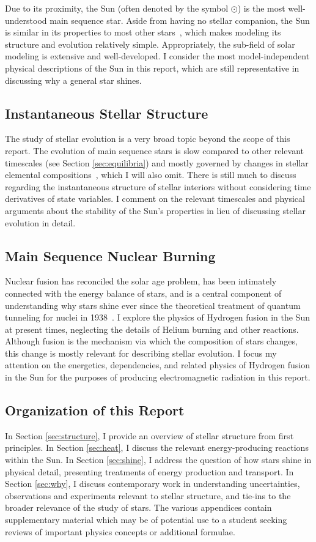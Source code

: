 \documentclass[12pt]{article}
\begin{document}
Due to its proximity, the Sun (often denoted by the symbol $\odot$) is the most well-understood main sequence star. Aside from having no stellar companion, the Sun is similar in its properties to most other stars~\cite{Robles_2008, Gustafsson_2008}, which makes modeling its structure and evolution relatively simple. Appropriately, the sub-field of solar modeling is extensive and well-developed. I consider the most model-independent physical descriptions of the Sun in this report, which are still representative in discussing why a general star shines.

\subsection{Instantaneous Stellar Structure}
The study of stellar evolution is a very broad topic beyond the scope of this report. The evolution of main sequence stars is slow compared to other relevant timescales (see Section \ref{sec:equilibria}) and mostly governed by changes in stellar elemental compositions~\cite{KWW_book}, which I will also omit. There is still much to discuss regarding the instantaneous structure of stellar interiors without considering time derivatives of state variables. I comment on the relevant timescales and physical arguments about the stability of the Sun's properties in lieu of discussing stellar evolution in detail.
\subsection{Main Sequence Nuclear Burning}
Nuclear fusion has reconciled the solar age problem, has been intimately connected with the energy balance of stars, and is a central component of understanding why stars shine ever since the theoretical treatment of quantum tunneling for nuclei in 1938~\cite{Gamow1938}. I explore the physics of Hydrogen fusion in the Sun at present times, neglecting the details of Helium burning and other reactions. Although fusion is the mechanism via which the composition of stars changes, this change is mostly relevant for describing stellar evolution. I focus my attention on the energetics, dependencies, and related physics of Hydrogen fusion in the Sun for the purposes of producing electromagnetic radiation in this report. 
\subsection{Organization of this Report}
In Section \ref{sec:structure}, I provide an overview of stellar structure from first principles. In Section \ref{sec:heat}, I discuss the relevant energy-producing reactions within the Sun. In Section \ref{sec:shine}, I address the question of how stars shine in physical detail, presenting treatments of energy production and transport. In Section \ref{sec:why}, I discuss contemporary work in understanding uncertainties, observations and experiments relevant to stellar structure, and tie-ins to the broader relevance of the study of stars. The various appendices contain supplementary material which may be of potential use to a student seeking reviews of important physics concepts or additional formulae. 
\end{document}
